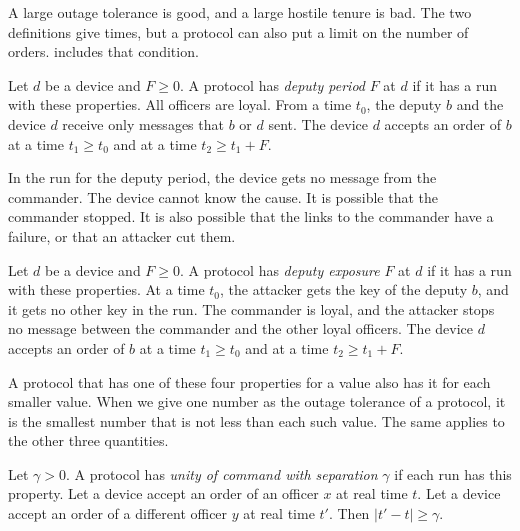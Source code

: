 A large outage tolerance is good, and a large hostile tenure is bad. The two definitions
give times, but a protocol can also put a limit on the number of orders. 
includes that condition.

\begin{dfn}
\label{def:deputy}
Let $d$ be a device and $F \ge 0$. A protocol has \emph{deputy period} $F$ at $d$ if it has
a run with these properties. All officers are loyal. From a time $t_0$, the deputy $b$ and
the device $d$ receive only messages that $b$ or $d$ sent. The device $d$ accepts an order
of $b$ at a time $t_1 \ge t_0$ and at a time $t_2 \ge t_1 + F$.
\end{dfn}

In the run for the deputy period, the device gets no message from the commander. The device
cannot know the cause. It is possible that the commander stopped. It is also possible that
the links to the commander have a failure, or that an attacker cut them.

\begin{dfn}
\label{def:exposure}
Let $d$ be a device and $F \ge 0$. A protocol has \emph{deputy exposure} $F$ at $d$ if it
has a run with these properties. At a time $t_0$, the attacker gets the key of the deputy
$b$, and it gets no other key in the run. The commander is loyal, and the attacker stops no
message between the commander and the other loyal officers. The device $d$ accepts an order
of $b$ at a time $t_1 \ge t_0$ and at a time $t_2 \ge t_1 + F$.
\end{dfn}

A protocol that has one of these four properties for a value also has it for each smaller
value. When we give one number as the outage tolerance of a protocol, it is the smallest
number that is not less than each such value. The same applies to the other three
quantities.

\begin{dfn}
\label{def:unity}
Let $\gamma > 0$. A protocol has \emph{unity of command with separation} $\gamma$ if each
run has this property. Let a device accept an order of an officer $x$ at real time $t$.
Let a device accept an order of a different officer $y$ at real time $t'$. Then
$|t' - t| \ge \gamma$.
\end{dfn}
